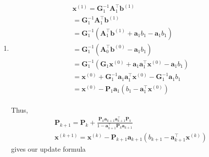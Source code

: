 \documentclass[10pt]{article}
\begin{document}
\begin{enumerate}
\begin{enumerate}
        \item \begin{align*}
            &\mathbf{x}^{(1)}=\mathbf{G}_1^{-1}\mathbf{A}_1^\top\mathbf{b}^{(1)}\\
            &=\mathbf{G}_1^{-1}\mathbf{A}_1^\top\mathbf{b}^{(1)}\\
            &=\mathbf{G}_1^{-1}(\mathbf{A}_1^\top\mathbf{b}^{(1)}+\mathbf{a}_1b_1-\mathbf{a}_1b_1)\\
            &=\mathbf{G}_1^{-1}(\mathbf{A}_0^\top\mathbf{b}^{(0)}-\mathbf{a}_1b_1)\\
            &=\mathbf{G}_1^{-1}(\mathbf{G}_1\mathbf{x}^{(0)}+\mathbf{a}_1\mathbf{a}_1^\top\mathbf{x}^{(0)}-\mathbf{a}_1b_1)\\
            &=\mathbf{x}^{(0)}+\mathbf{G}_1^{-1}\mathbf{a}_1\mathbf{a}_1^\top\mathbf{x}^{(0)}-\mathbf{G}_1^{-1}\mathbf{a}_1b_1\\
            &=\mathbf{x}^{(0)}-\mathbf{P}_1\mathbf{a}_1(b_1-\mathbf{a}_1^\top\mathbf{x}^{(0)})
        \end{align*}\\
        Thus, \begin{align*}
            &\mathbf{P}_{k+1}=\mathbf{P}_k+\frac{\mathbf{P}_k\mathbf{a}_{k+1}\mathbf{a}_{k+1}^\top\mathbf{P}_k}{1-\mathbf{a}_{k+1}^\top\mathbf{P}_k\mathbf{a}_{k+1}}\\
            &\mathbf{x}^{(k+1)}=\mathbf{x}^{(k)}-\mathbf{P}_{k+1}\mathbf{a}_{k+1}(b_{k+1}-\mathbf{a}_{k+1}^\top\mathbf{x}^{(k)})
        \end{align*}
        gives our update formula
    \end{enumerate}
\end{enumerate}
\end{document}
